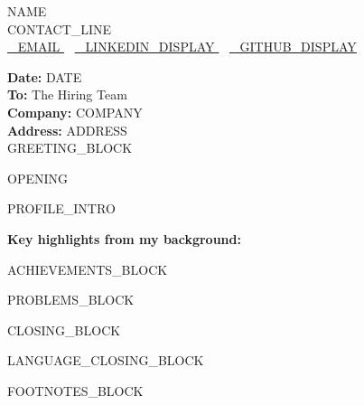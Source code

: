 \documentclass[letterpaper,11pt]{article}
\begin{document}
\begin{center}
    {\Huge\scshape {{NAME}}} \\ \vspace{6pt}
    {{CONTACT_LINE}}\\ \vspace{4pt}
    \small
    \href{mailto:{{EMAIL}}}{\raisebox{-0.2\height}{\faEnvelope}\ \underline{ {{EMAIL}} }} ~
    \href{ {{LINKEDIN_URL}} }{\raisebox{-0.2\height}{\faLinkedin}\ \underline{ {{LINKEDIN_DISPLAY}} }} ~
    \href{ {{GITHUB_URL}} }{\raisebox{-0.2\height}{\faGithub}\ \underline{ {{GITHUB_DISPLAY}} }}
\end{center}

\vspace{15pt}

\noindent \textbf{Date:} {{DATE}} \\
\noindent \textbf{To:} The Hiring Team \\
\noindent \textbf{Company:} {{COMPANY}} \\
\noindent \textbf{Address:} {{ADDRESS}} \\

\vspace{8pt}
{{GREETING_BLOCK}}

\vspace{8pt}
{{OPENING}}

\vspace{8pt}
{{PROFILE_INTRO}}

\vspace{8pt}
\noindent \textbf{Key highlights from my background:}
\begin{itemize}[leftmargin=*, noitemsep, topsep=0pt]
{{ACHIEVEMENTS_BLOCK}}
\end{itemize}

\vspace{8pt}
{{PROBLEMS_BLOCK}}

\vspace{8pt}
{{CLOSING_BLOCK}}

\vspace{15pt}
{{LANGUAGE_CLOSING_BLOCK}}\par
\vspace{25pt}

{{FOOTNOTES_BLOCK}}
\end{document}
